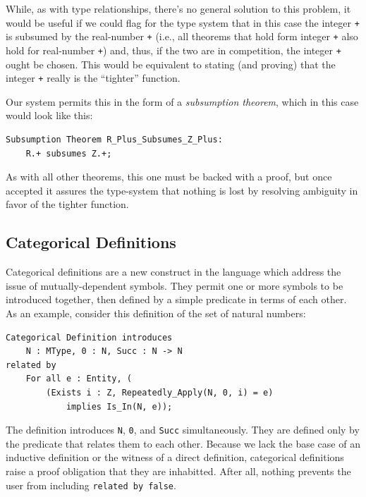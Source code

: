 While, as with type relationships, there's no general solution to this problem, it would be useful if we could flag for the type system that in this case the integer \texttt{+} is subsumed by the real-number \texttt{+} (i.e., all theorems that hold form integer \texttt{+} also hold for real-number \texttt{+}) and, thus, if the two are in competition, the integer \texttt{+} ought be chosen.  This would be equivalent to stating (and proving) that the integer \texttt{+} really is the ``tighter'' function.

Our system permits this in the form of a \emph{subsumption theorem}, which in this case would look like this:

\begin{lstlisting}
Subsumption Theorem R_Plus_Subsumes_Z_Plus:
	R.+ subsumes Z.+;
\end{lstlisting}

As with all other theorems, this one must be backed with a proof, but once accepted it assures the type-system that nothing is lost by resolving ambiguity in favor of the tighter function.


	\subsection{Categorical Definitions\label{sec:categoricalDefinitions}}

Categorical definitions are a new construct in the language which address the issue of mutually-dependent symbols.  They permit one or more symbols to be introduced together, then defined by a simple predicate in terms of each other.  As an example, consider this definition of the set of natural numbers:

\begin{lstlisting}
Categorical Definition introduces
	N : MType, 0 : N, Succ : N -> N
related by
	For all e : Entity, (
		(Exists i : Z, Repeatedly_Apply(N, 0, i) = e)
			implies Is_In(N, e));
\end{lstlisting}

The definition introduces \texttt{N}, \texttt{0}, and \texttt{Succ} simultaneously.  They are defined only by the predicate that relates them to each other.  Because we lack the base case of an inductive definition or the witness of a direct definition, categorical definitions raise a proof obligation that they are inhabitted.  After all, nothing prevents the user from including \texttt{related by false}.
